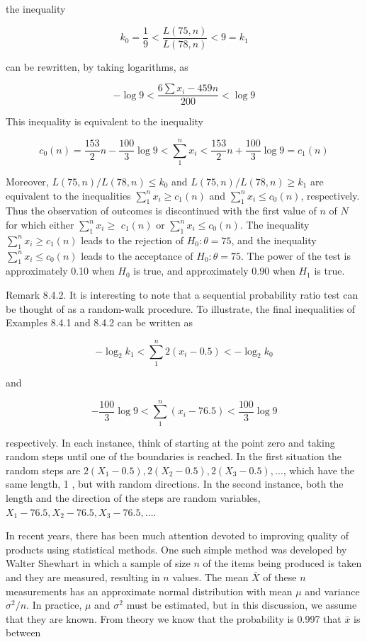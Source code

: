 the inequality

$$
k_{0}=\frac{1}{9}<\frac{L(75, n)}{L(78, n)}<9=k_{1}
$$

can be rewritten, by taking logarithms, as

$$
-\log 9<\frac{6 \sum x_{i}-459 n}{200}<\log 9
$$

This inequality is equivalent to the inequality

$$
c_{0}(n)=\frac{153}{2} n-\frac{100}{3} \log 9<\sum_{1}^{n} x_{i}<\frac{153}{2} n+\frac{100}{3} \log 9=c_{1}(n)
$$

Moreover, $L(75, n) / L(78, n) \leq k_{0}$ and $L(75, n) / L(78, n) \geq k_{1}$ are equivalent to the inequalities $\sum_{1}^{n} x_{i} \geq c_{1}(n)$ and $\sum_{1}^{n} x_{i} \leq c_{0}(n)$, respectively. Thus the observation of outcomes is discontinued with the first value of $n$ of $N$ for which either $\sum_{1}^{n} x_{i} \geq$ $c_{1}(n)$ or $\sum_{1}^{n} x_{i} \leq c_{0}(n)$. The inequality $\sum_{1}^{n} x_{i} \geq c_{1}(n)$ leads to the rejection of $H_{0}: \theta=75$, and the inequality $\sum_{1}^{n} x_{i} \leq c_{0}(n)$ leads to the acceptance of $H_{0}: \theta=75$. The power of the test is approximately 0.10 when $H_{0}$ is true, and approximately 0.90 when $H_{1}$ is true.

Remark 8.4.2. It is interesting to note that a sequential probability ratio test can be thought of as a random-walk procedure. To illustrate, the final inequalities of Examples 8.4.1 and 8.4.2 can be written as

$$
-\log _{2} k_{1}<\sum_{1}^{n} 2\left(x_{i}-0.5\right)<-\log _{2} k_{0}
$$

and

$$
-\frac{100}{3} \log 9<\sum_{1}^{n}\left(x_{i}-76.5\right)<\frac{100}{3} \log 9
$$

respectively. In each instance, think of starting at the point zero and taking random steps until one of the boundaries is reached. In the first situation the random steps are $2\left(X_{1}-0.5\right), 2\left(X_{2}-0.5\right), 2\left(X_{3}-0.5\right), \ldots$, which have the same length, 1 , but with random directions. In the second instance, both the length and the direction of the steps are random variables, $X_{1}-76.5, X_{2}-76.5, X_{3}-76.5, \ldots$.

In recent years, there has been much attention devoted to improving quality of products using statistical methods. One such simple method was developed by Walter Shewhart in which a sample of size $n$ of the items being produced is taken and they are measured, resulting in $n$ values. The mean $\bar{X}$ of these $n$ measurements has an approximate normal distribution with mean $\mu$ and variance $\sigma^{2} / n$. In practice, $\mu$ and $\sigma^{2}$ must be estimated, but in this discussion, we assume that they are known. From theory we know that the probability is 0.997 that $\bar{x}$ is between


